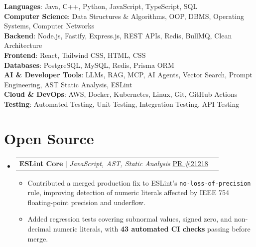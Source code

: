 \documentclass[letterpaper,10pt]{article}
\makeatletter
\newcommand{\resumeItem}[1]{
  \item\small{#1\vspace{-1pt}}
}
\newcommand{\resumeProjectHeading}[2]{
  \item
  \begin{tabular*}{0.97\textwidth}[t]{l@{\extracolsep{\fill}}r}
    \small#1 & #2 \\
  \end{tabular*}
  \vspace{1pt}
}
\newcommand{\resumeSubHeadingListStart}{
\begin{itemize}[
    leftmargin=0.15in,
    label={},
    itemsep=1.5pt,
    parsep=0pt,
    topsep=1.5pt,
    partopsep=0pt
]
}
\newcommand{\resumeSubHeadingListEnd}{
\end{itemize}
\vspace{-3pt}
}
\newcommand{\resumeItemListStart}{
\begin{itemize}[
    itemsep=0.6pt,
    parsep=0pt,
    topsep=1pt,
    partopsep=0pt,
    leftmargin=0.18in
]
}
\newcommand{\resumeItemListEnd}{
\end{itemize}
\vspace{-2pt}
}
\makeatother
\begin{document}
\begin{itemize}[
    leftmargin=0.15in,
    label={},
    itemsep=1pt,
    parsep=0pt,
    topsep=1pt
]


\small{\item{
\textbf{Languages}{: Java, C++, Python, JavaScript, TypeScript, SQL} \\
\textbf{Computer Science}{: Data Structures \& Algorithms, OOP, DBMS, Operating Systems, Computer Networks} \\
\textbf{Backend}{: Node.js, Fastify, Express.js, REST APIs, Redis, BullMQ, Clean Architecture} \\
\textbf{Frontend}{: React, Tailwind CSS, HTML, CSS} \\
\textbf{Databases}{: PostgreSQL, MySQL, Redis, Prisma ORM} \\
\textbf{AI \& Developer Tools}{: LLMs, RAG, MCP, AI Agents, Vector Search, Prompt Engineering, AST Static Analysis, ESLint} \\
\textbf{Cloud \& DevOps}{: AWS, Docker, Kubernetes, Linux, Git, GitHub Actions} \\
\textbf{Testing}{: Automated Testing, Unit Testing, Integration Testing, API Testing}
}}


\end{itemize}

\vspace{-5pt}

\section{Open Source}

\resumeSubHeadingListStart

\resumeProjectHeading
{\textbf{ESLint Core} $|$ \emph{JavaScript, AST, Static Analysis}
\hfill
\href{https://github.com/eslint/eslint/pull/21218}{PR \#21218}}{}

\resumeItemListStart

    \resumeItem{Contributed a merged production fix to ESLint's \texttt{no-loss-of-precision} rule, improving detection of numeric literals affected by IEEE 754 floating-point precision and underflow.}

    \resumeItem{Added regression tests covering subnormal values, signed zero, and non-decimal numeric literals, with \textbf{43 automated CI checks} passing before merge.}

\resumeItemListEnd

\resumeSubHeadingListEnd
\end{document}
